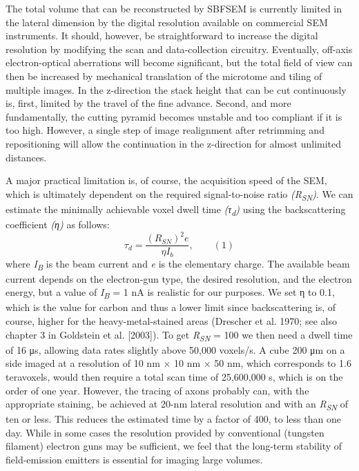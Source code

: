 \documentclass{article}
\begin{document}

The total volume that can be reconstructed by SBFSEM is currently limited in the lateral dimension by the digital resolution available on commercial SEM instruments. It should, however, be straightforward to increase the digital resolution by modifying the scan and data-collection circuitry. Eventually, off-axis electron-optical aberrations will become significant, but the total field of view can then be increased by mechanical translation of the microtome and tiling of multiple images. In the z-direction the stack height that can be cut continuously is, first, limited by the travel of the fine advance. Second, and more fundamentally, the cutting pyramid becomes unstable and too compliant if it is too high. However, a single step of image realignment after retrimming and repositioning will allow the continuation in the z-direction for almost unlimited distances.

A major practical limitation is, of course, the acquisition speed of the SEM, which is ultimately dependent on the required signal-to-noise ratio \emph{(R\textsubscript{SN})}. We can estimate the minimally achievable voxel dwell time \emph{(τ\textsubscript{d})} using the backscattering coefficient \emph{(η)} as follows:
\[
\tau_d = \frac{(R_{SN})^2 e}{\eta I_b}, \qquad (1)
\]
where \emph{I}\textsubscript{\emph{B}} is the beam current and \emph{e} is the elementary charge. The available beam current depends on the electron-gun type, the desired resolution, and the electron energy, but a value of \emph{I}\textsubscript{\emph{B}} = 1 nA is realistic for our purposes. We set η to 0.1, which is the value for carbon and thus a lower limit since backscattering is, of course, higher for the heavy-metal-stained areas (Drescher et al. 1970; see also chapter 3 in Goldstein et al. [2003]). To get \emph{R}\textsubscript{\emph{SN}} = 100 we then need a dwell time of 16 μs, allowing data rates slightly above 50,000 voxels/s. A cube 200 μm on a side imaged at a resolution of 10 nm × 10 nm × 50 nm, which corresponds to 1.6 teravoxels, would then require a total scan time of 25,600,000 s, which is on the order of one year. However, the tracing of axons probably can, with the appropriate staining, be achieved at 20-nm lateral resolution and with an \emph{R}\textsubscript{\emph{SN}} of ten or less. This reduces the estimated time by a factor of 400, to less than one day. While in some cases the resolution provided by conventional (tungsten filament) electron guns may be sufficient, we feel that the long-term stability of field-emission emitters is essential for imaging large volumes.
\end{document}
